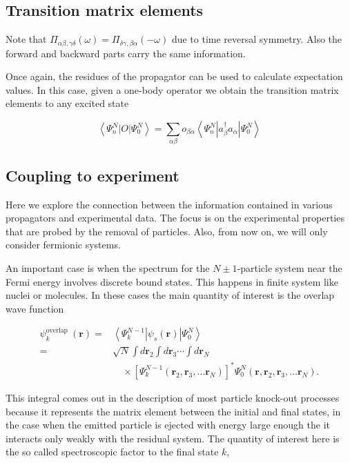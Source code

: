 {\subsection{Transition matrix elements}

Note that $\Pi_{\alpha \beta, \gamma \delta}(\omega)=\Pi_{\delta
  \gamma, \beta \alpha}(-\omega)$ due to time reversal symmetry. Also
the forward and backward parts carry the same information.

Once again, the residues of the propagator can be used to
calculate expectation values. In this case, given a one-body operator
we obtain the transition matrix elements to any excited state

$$
\left\langle\Psi_{n}^{N}|O| \Psi_{0}^{N}\right\rangle=\sum_{\alpha \beta} o_{\beta \alpha}\left\langle\Psi_{n}^{N}\left|a_{\beta}^{\dagger} a_{\alpha}\right| \Psi_{0}^{N}\right\rangle
$$


\subsection{Coupling to experiment}

Here we explore the connection between the information contained in
various propagators and experimental data. The focus is on the
experimental properties that are probed by the removal of
particles. Also, from now on, we will only consider fermionic systems.

An important case is when the spectrum for the $N \pm 1$-particle
system near the Fermi energy involves discrete bound states. This
happens in finite system like nuclei or molecules. In these cases the
main quantity of interest is the overlap wave function

$$
\begin{aligned}
\psi_{k}^{\text {overlap }}(\mathbf{r})= & \left\langle\Psi_{k}^{N-1}\left|\psi_{s}(\mathbf{r})\right| \Psi_{0}^{N}\right\rangle \\
= & \sqrt{N} \int d \mathbf{r}_{2} \int d \mathbf{r}_{3} \cdots \int d \mathbf{r}_{N} \\
& \quad \times\left[\Psi_{k}^{N-1}\left(\mathbf{r}_{2}, \mathbf{r}_{3}, \ldots \mathbf{r}_{N}\right)\right]^{*} \Psi_{0}^{N}\left(\mathbf{r}, \mathbf{r}_{2}, \mathbf{r}_{3}, \ldots \mathbf{r}_{N}\right) .
\end{aligned}
$$


This integral comes out in the description of most
particle knock-out processes because it represents the matrix element
between the initial and final states, in the case when the emitted
particle is ejected with energy large enough the it interacts only
weakly with the residual system. The quantity of interest here is the
so called spectroscopic factor to the final state $k$,

}
